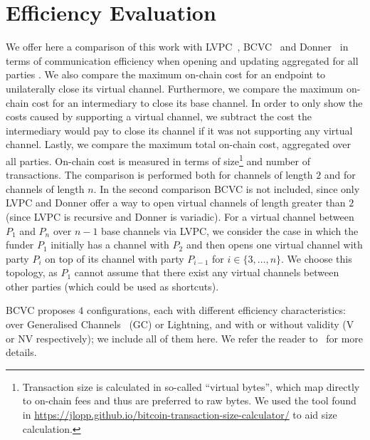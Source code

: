 \section{Efficiency Evaluation}
  \label{section:comparison}
  We offer here a comparison of this work with
  LVPC~\cite{10.1007/978-3-030-65411-5_18}, BCVC~\cite{cryptoeprint:2020:554}
  and Donner~\cite{donner} in terms of communication efficiency when opening and
  updating aggregated for all parties . We also compare
  the maximum on-chain cost for an endpoint to unilaterally close its virtual
  channel. Furthermore, we compare the maximum on-chain cost for an intermediary
  to close its base channel. In order to only show the costs caused by
  supporting a virtual channel, we subtract the cost the intermediary would pay
  to close its channel if it was not supporting any virtual channel. Lastly, we
  compare the maximum total on-chain cost, aggregated over all parties. On-chain
  cost is measured in terms of size\footnote{Transaction size is calculated in
  so-called ``virtual bytes'', which map directly to on-chain fees and thus are
  preferred to raw bytes. We used the tool found in
  \url{https://jlopp.github.io/bitcoin-transaction-size-calculator/} to aid size
  calculation.} and number of transactions. The comparison is performed both for
  channels of length $2$ and for channels of length $n$. In the second
  comparison BCVC is not included, since only LVPC and Donner offer a way to
  open virtual channels of length greater than $2$ (since LVPC is recursive and
  Donner is variadic). For a virtual channel between $P_1$ and $P_n$ over $n-1$
  base channels via LVPC, we consider the case in which the funder $P_1$
  initially has a channel with $P_2$ and then opens one virtual channel with
  party $P_i$ on top of its channel with party $P_{i-1}$ for $i \in \{3, \dots,
  n\}$. We choose this topology, as $P_1$ cannot assume that there exist any
  virtual channels between other parties (which could be used as shortcuts).

  BCVC proposes $4$ configurations, each with different efficiency
  characteristics: over Generalised Channels~\cite{cryptoeprint:2020:476} (GC)
  or Lightning, and with or without validity (V or NV respectively); we include
  all of them here. We refer the reader to~\cite{cryptoeprint:2020:554} for more
  details.

